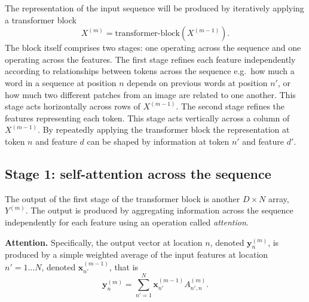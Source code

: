 \documentclass{article}
\begin{document}
The representation of the input sequence will be produced by iteratively applying a transformer block \[X^{(m)} = \text{transformer-block}(X^{(m-1)}).\] The block itself comprises two stages: one operating across the sequence and one operating across the features. The first stage refines each feature independently according to relationships between tokens across the sequence e.g.~how much a word in a sequence at position $n$ depends on previous words at position $n'$, or how much two different patches from an image are related to one another. This stage acts horizontally across rows of $X^{(m-1)}$.  The second stage refines the features representing each token. This stage acts vertically across a column of $X^{(m-1)}$. By repeatedly applying the transformer block the representation at token $n$ and feature $d$ can be shaped by information at token $n'$ and feature $d'$.

\subsection{Stage 1: self-attention across the sequence}
%
The output of the first stage of the transformer block is another $D \times N$ array, $Y^{(m)}$. The output is produced by aggregating information across the sequence independently for each feature using an operation called \emph{attention}. 

\textbf{Attention.} Specifically, the output vector at location $n$, denoted $\bm{y}^{(m)}_n$, is produced by a simple weighted average of the input features at location $n'=1 \hdots N$, denoted $\bm{x}^{(m-1)}_{n'}$, that is
%
\begin{equation} \bm{y}^{(m)}_n = \sum_{n'=1}^N \bm{x}^{(m-1)}_{n'} A^{(m)}_{n',n}. \label{eq:attention} \end{equation}
\end{document}
